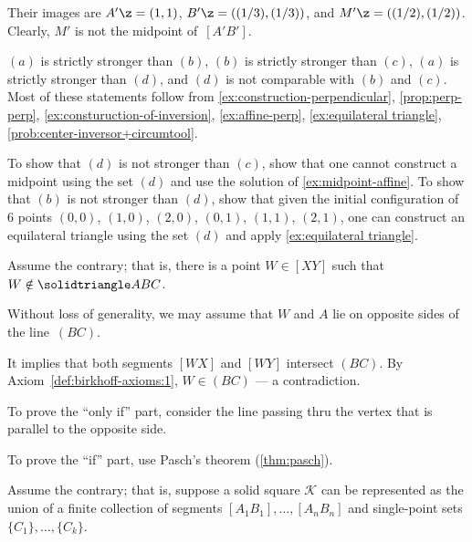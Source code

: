 Their images are $A'\z=(1,1)$, $B'\z=(\tfrac13,\tfrac13)$, and $M'\z=(\tfrac12,\tfrac12)$.
Clearly, $M'$ is not the midpoint of~$[A'B']$.


$(a)$ is strictly stronger than $(b)$,
$(b)$ is strictly stronger than $(c)$,
$(a)$ is strictly stronger than $(d)$,
and $(d)$ is not comparable with $(b)$ and $(c)$.
Most of these statements follow from \ref{ex:construction-perpendicular},
\ref{prop:perp-perp},
\ref{ex:consturuction-of-inversion},
\ref{ex:affine-perp},
\ref{ex:equilateral triangle}, 
\ref{prob:center-inversor+circumtool}.

To show that $(d)$ is not stronger than $(c)$, show that one cannot construct a midpoint using the set $(d)$ and use the solution of \ref{ex:midpoint-affine}.
To show that $(b)$ is not stronger than $(d)$, show that given the initial configuration of 6 points 
$(0,0)$, 
$(1,0)$,
$(2,0)$,
$(0,1)$, 
$(1,1)$,
$(2,1)$,
one can construct an equilateral triangle using the set $(d)$ and apply \ref{ex:equilateral triangle}.

\setcounter{eqtn}{0} 

Assume the contrary; 
that is, there is a point $W\in [XY]$ such that $W\notin\solidtriangle ABC$.

Without  loss of generality, we may assume that $W$ and $A$ lie on opposite sides of the line~$(BC)$.

It implies that both segments $[WX]$ and $[WY]$ intersect $(BC)$.
By Axiom~\ref{def:birkhoff-axioms:1}, $W\in (BC)$ --- a contradiction.


To prove the ``only if'' part, consider the line passing thru the vertex that is parallel to the opposite side.

To prove the ``if'' part, use Pasch's theorem (\ref{thm:pasch}).

Assume the contrary; that is, suppose a solid square \( \mathcal{K} \) can be represented as the union of a finite collection of segments \( [A_1B_1],\dots,[A_nB_n] \)
and single-point sets \( \{C_1\},\dots,\{C_k\} \).

